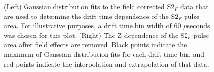 \documentclass[a4paper,12pt]{article}
\begin{document}
{\begin{figure} 
\centering
{}
\qquad
{}
\caption{ (Left) Gaussian distribution fits to the field corrected S2$_F$ data that are used to determine the drift time dependence of the S2$_F$ pulse area. For illustrative purposes, a drift time bin width of 60 $\mu$seconds was chosen for this plot. (Right) The Z dependence of the S2$_F$ pulse area after field effects are removed.  Black points indicate the maximum of Gaussian distribution fits for each drift time bin, and red points indicate the interpolation and extrapolation of that data.}
\label{fig:KrypCal_S2ZDep}
\end{figure}

}
\end{document}
